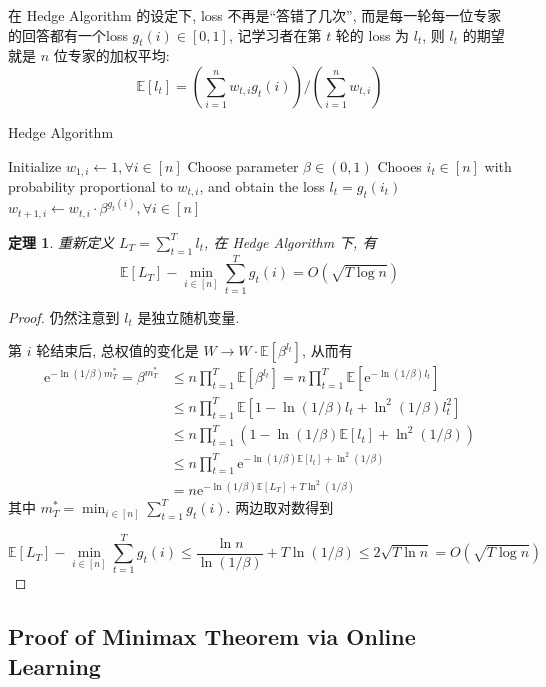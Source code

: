 \documentclass[8pt]{article}
\theoremstyle{compact}
\newtheorem{theorem}{定理}[section]
\def\le{\leqslant}
\def\E#1{\mathbb{E}\left[{#1}\right]}
\def\e{\mathrm{e}}
\begin{document}
在 Hedge Algorithm 的设定下, loss 不再是“答错了几次”, 而是每一轮每一位专家的回答都有一个loss $g_t(i) \in [0, 1]$, 记学习者在第 $t$ 轮的 loss 为 $l_t$, 则 $l_t$ 的期望就是 $n$ 位专家的加权平均: $$\E{l_t} = \left(\sum\limits_{i=1}^{n}w_{t, i}g_t(i)\right) \bigg/ \left(\sum\limits_{i=1}^{n}w_{t, i}\right)$$

\begin{algorithm}
	\caption{Hedge Algorithm}
	\begin{algorithmic}[1]
		\State Initialize $w_{1, i} \gets 1, \forall i \in [n]$
		\State Choose parameter $\beta \in (0, 1)$
			\State Chooes $i_t \in [n]$ with probability proportional to $w_{t, i}$, and obtain the loss $l_t = g_t(i_t)$
			\State $w_{t + 1, i} \gets w_{t, i} \cdot \beta^{g_t(i)}, \forall i \in [n]$
		\EndFor
	\end{algorithmic}
\end{algorithm}

\begin{theorem}
	重新定义 $L_T = \sum\limits_{t=1}^{T}l_t$, 在 Hedge Algorithm 下, 有
	$$\E{L_T} - \min_{i \in [n]}\sum_{t=1}^{T}g_t(i) = O(\sqrt{T\log n})$$
	\label{Hedge}
\end{theorem}
\begin{proof}
	仍然注意到 $l_t$ 是独立随机变量.

	第 $i$ 轮结束后, 总权值的变化是 $W \to W \cdot \E{\beta^{l_t}}$, 从而有
	\begin{equation*}
		\begin{split}
			\e^{-\ln(1/\beta)m_T^*} = \beta^{m_T^*} &\le n\prod_{t=1}^{T}\E{\beta^{l_t}} = n\prod_{t=1}^{T}\E{\e^{-\ln(1/\beta)l_t}} \\
			&\le n\prod_{t=1}^{T}\E{1 - \ln(1/\beta)l_t + \ln^2(1/\beta)l_t^2} \\
			&\le n\prod_{t=1}^{T}\left(1 - \ln(1/\beta)\E{l_t} + \ln^2(1/\beta)\right) \\
			&\le n\prod_{t=1}^{T}\e^{-\ln(1/\beta)\E{l_t} + \ln^2(1/\beta)} \\
			&= n\e^{-\ln(1/\beta)\E{L_T} + T\ln^2(1/\beta)}
		\end{split}
	\end{equation*}
	其中 $m_T^* = \min_{i \in [n]}\sum_{t=1}^{T}g_t(i)$. 两边取对数得到

	$$\E{L_T} - \min_{i \in [n]}\sum_{t=1}^{T}g_t(i) \le \frac{\ln n}{\ln(1/\beta)} + T\ln(1/\beta) \le 2\sqrt{T\ln n} = O(\sqrt{T\log n})$$
\end{proof}

\subsection{Proof of Minimax Theorem via Online Learning}
\end{document}
